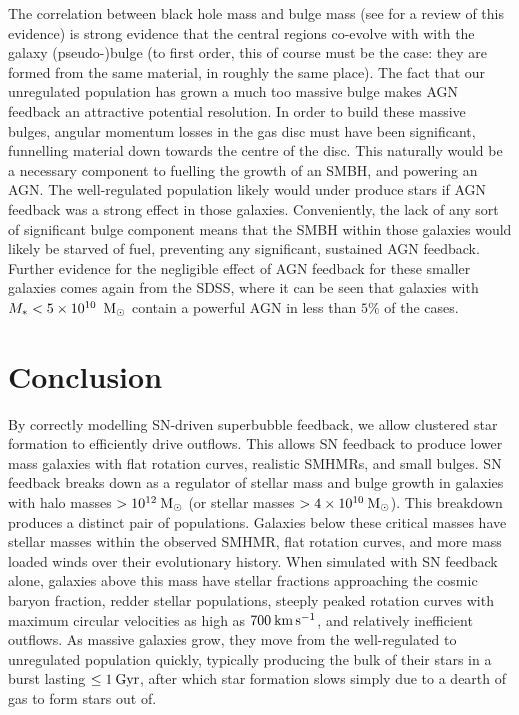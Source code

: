 The correlation between black hole mass and bulge mass (see \citealt{Kormendy2013}
for a review of this evidence) is strong evidence that the central regions
co-evolve with with the galaxy (pseudo-)bulge (to first order, this of course
must be the case: they are formed from the same material, in roughly the same
place).  The fact that our unregulated population has grown a much too
massive bulge makes AGN feedback an attractive potential resolution.  In order
to build these massive bulges, angular momentum losses in the gas disc must have
been significant, funnelling material down towards the centre of the disc.  This
naturally would be a necessary component to fuelling the growth of an SMBH, and
powering an AGN.  The well-regulated population likely would
under produce stars if AGN feedback was a strong effect in those galaxies.  
Conveniently, the lack of any sort of significant bulge component means that the
SMBH within those galaxies would likely be starved of fuel, preventing any
significant, sustained AGN feedback.  Further evidence for the negligible effect
of AGN feedback for these smaller galaxies comes again from the SDSS, where it
can be seen that galaxies with $M_*<5\times10^{10}\;\>{\rm M_{\odot}}$ contain a powerful
AGN in less than $5\%$ of the cases.

\section{Conclusion}
By correctly modelling SN-driven superbubble feedback, we allow
clustered star formation to efficiently drive outflows.  This allows SN
feedback to produce lower mass galaxies with flat rotation curves, realistic
SMHMRs, and small bulges.  SN feedback breaks down as a regulator of stellar
mass and bulge growth in galaxies with halo masses $>10^{12}\>{\rm M_{\odot}}$ (or stellar
masses  $> 4 \times 10^{10}\>{\rm M_{\odot}}$).  This breakdown produces a distinct pair of
populations.   Galaxies below these
critical masses have stellar masses within the observed SMHMR, flat rotation
curves, and more mass loaded winds over their evolutionary history.
When simulated with SN feedback alone,  galaxies
above this mass have stellar fractions approaching the cosmic baryon fraction,
redder stellar populations, steeply peaked rotation curves with maximum circular
velocities as high as $700\>{\rm km}\,{\rm s}^{-1}$, and relatively inefficient outflows.  As
massive galaxies grow, they move from the well-regulated to unregulated
population quickly, typically producing the bulk of their stars in a burst
lasting $\le1\>{\rm Gyr}$, after which star formation slows simply due to a dearth of
gas to form stars out of.

